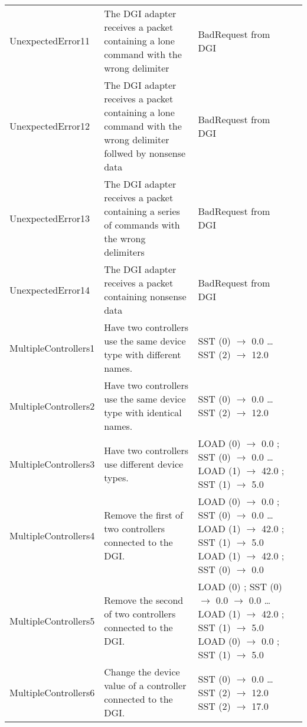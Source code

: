 \documentclass{article}
\begin{document}
\begin{center}
\begin{footnotesize}
\begin{longtable}{|p{3cm}|p{4cm}|p{10cm}|c|}
    UnexpectedError11 & The DGI adapter receives a packet containing a lone command with the wrong delimiter & BadRequest from DGI & \\
    UnexpectedError12 & The DGI adapter receives a packet containing a lone command with the wrong delimiter follwed by nonsense data & BadRequest from DGI & \\
    UnexpectedError13 & The DGI adapter receives a packet containing a series of commands with the wrong delimiters & BadRequest from DGI & \\
    UnexpectedError14 & The DGI adapter receives a packet containing nonsense data & BadRequest from DGI & \\
    MultipleControllers1 & Have two controllers use the same device type with different names. & SST (0) $\rightarrow$ 0.0 \newline \ldots \newline SST (2) $\rightarrow$ 12.0 & \\
    MultipleControllers2 & Have two controllers use the same device type with identical names. & SST (0) $\rightarrow$ 0.0 \newline \ldots \newline SST (2) $\rightarrow$ 12.0 & \\
    MultipleControllers3 & Have two controllers use different device types. & LOAD (0) $\rightarrow$ 0.0 ; SST (0) $\rightarrow$ 0.0 \newline \ldots \newline LOAD (1) $\rightarrow$ 42.0 ; SST (1) $\rightarrow$ 5.0 & \\
    MultipleControllers4 & Remove the first of two controllers connected to the DGI. & LOAD (0) $\rightarrow$ 0.0 ; SST (0) $\rightarrow$ 0.0 \newline \ldots \newline LOAD (1) $\rightarrow$ 42.0 ; SST (1) $\rightarrow$ 5.0 \newline LOAD (1) $\rightarrow$ 42.0 ; SST (0) $\rightarrow$ 0.0 & \\
    MultipleControllers5 & Remove the second of two controllers connected to the DGI. & LOAD (0) ; SST (0) $\rightarrow$ 0.0 $\rightarrow$ 0.0 \newline \ldots \newline LOAD (1) $\rightarrow$ 42.0 ; SST (1) $\rightarrow$ 5.0 \newline LOAD (0) $\rightarrow$ 0.0 ; SST (1) $\rightarrow$ 5.0 & \\
    MultipleControllers6 & Change the device value of a controller connected to the DGI. & SST (0) $\rightarrow$ 0.0 \newline \ldots \newline SST (2) $\rightarrow$ 12.0 \newline SST (2) $\rightarrow$ 17.0 & \\

\end{longtable}
\end{footnotesize}
\end{center}
\end{document}
